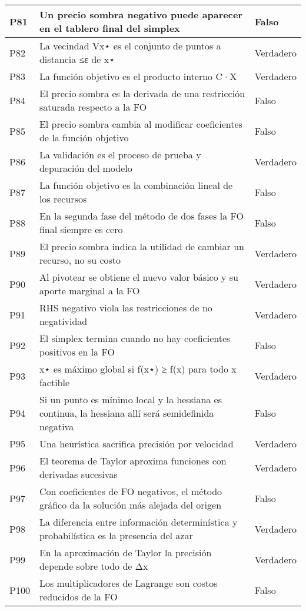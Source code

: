 \documentclass{article}
\begin{document}
\begin{longtable}{|>{\centering\arraybackslash}p{1.5cm}|>{\raggedright\arraybackslash}p{14cm}|>{\centering\arraybackslash}p{2cm}|}
\hline
P81 & Un precio sombra negativo puede aparecer en el tablero final del simplex & Falso \\
\hline
P82 & La vecindad Vx⋆ es el conjunto de puntos a distancia ≤ε de x⋆ & Verdadero \\
\hline
P83 & La función objetivo es el producto interno C·X & Verdadero \\
\hline
P84 & El precio sombra es la derivada de una restricción saturada respecto a la FO & Falso \\
\hline
P85 & El precio sombra cambia al modificar coeficientes de la función objetivo & Falso \\
\hline
P86 & La validación es el proceso de prueba y depuración del modelo & Verdadero \\
\hline
P87 & La función objetivo es la combinación lineal de los recursos & Falso \\
\hline
P88 & En la segunda fase del método de dos fases la FO final siempre es cero & Falso \\
\hline
P89 & El precio sombra indica la utilidad de cambiar un recurso, no su costo & Verdadero \\
\hline
P90 & Al pivotear se obtiene el nuevo valor básico y su aporte marginal a la FO & Verdadero \\
\hline
P91 & RHS negativo viola las restricciones de no negatividad & Verdadero \\
\hline
P92 & El simplex termina cuando no hay coeficientes positivos en la FO & Falso \\
\hline
P93 & x⋆ es máximo global si f(x⋆) ≥ f(x) para todo x factible & Verdadero \\
\hline
P94 & Si un punto es mínimo local y la hessiana es continua, la hessiana allí será semidefinida negativa & Falso \\
\hline
P95 & Una heurística sacrifica precisión por velocidad & Verdadero \\
\hline
P96 & El teorema de Taylor aproxima funciones con derivadas sucesivas & Verdadero \\
\hline
P97 & Con coeficientes de FO negativos, el método gráfico da la solución más alejada del origen & Falso \\
\hline
P98 & La diferencia entre información determinística y probabilística es la presencia del azar & Verdadero \\
\hline
P99 & En la aproximación de Taylor la precisión depende sobre todo de Δx & Verdadero \\
\hline
P100 & Los multiplicadores de Lagrange son costos reducidos de la FO & Falso \\

\end{longtable}
\end{document}
